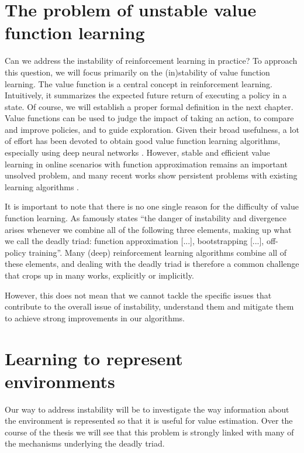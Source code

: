 \section{The problem of unstable value function learning}

Can we address the instability of reinforcement learning in practice?
To approach this question, we will focus primarily on the (in)stability of value function learning.
The value function is a central concept in reinforcement learning.
Intuitively, it summarizes the expected future return of executing a policy in a state.
Of course, we will establish a proper formal definition in the next chapter.
Value functions can be used to judge the impact of taking an action, to compare and improve policies, and to guide exploration.
Given their broad usefulness, a lot of effort has been devoted to obtain good value function learning algorithms, especially using deep neural networks \parencite{mnih2013playing,hasselt2010double,hasselt2016deep,fujimoto2018addressing,haarnoja2018sac}.
However, stable and efficient value learning in online scenarios with function approximation remains an important unsolved problem, and many recent works show persistent problems with existing learning algorithms \parencite{kumar2021implicit,nikishin2022primacy,hussing2024dissecting}.

It is important to note that there is no one single reason for the difficulty of value function learning.
As \textcite{suttonbook} famously states ``the danger of instability and divergence arises whenever we combine all of the following three elements, making up what we call the deadly triad: function approximation [...], bootstrapping [...], off-policy training''.
Many (deep) reinforcement learning algorithms combine all of these elements, and dealing with the deadly triad is therefore a common challenge that crops up in many works, explicitly or implicitly.

However, this does not mean that we cannot tackle the specific issues that contribute to the overall issue of instability, understand them and mitigate them to achieve strong improvements in our algorithms. 

\section{Learning to represent environments}

Our way to address instability will be to investigate the way information about the environment is represented so that it is useful for value estimation.
Over the course of the thesis we will see that this problem is strongly linked with many of the mechanisms underlying the deadly triad.

